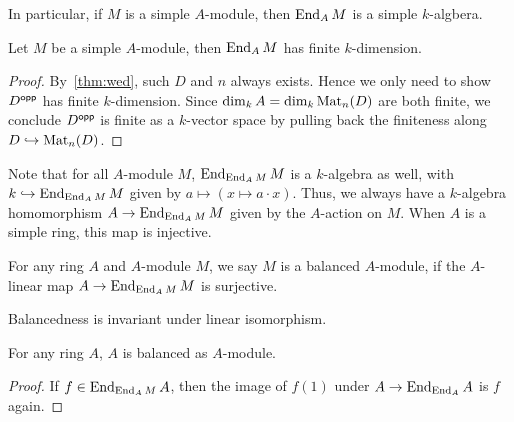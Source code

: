 \begin{remark}
  In particular, if $M$ is a simple $A$-module, then $\operatorname{End}_{A}M$ is a simple
  $k$-algbera.
\end{remark}

\begin{lemma}
  Let $M$ be a simple $A$-module, then $\operatorname{End}_{A}M$ has finite $k$-dimension.
  \leanok {}
\end{lemma}
\begin{proof}
  By~\cref{thm:wed}, such $D$ and $n$ always exists. Hence we only need to show
  $D^{\mathsf{opp}}$ has finite $k$-dimension. Since $\dim_{k}A=\dim_{k}\operatorname{Mat}_{n}(D)$ are
  both finite, we conclude $D^{\mathsf{opp}}$ is finite as a $k$-vector space by pulling
  back the finiteness along $D \hookrightarrow \operatorname{Mat}_{n}(D)$.
\end{proof}

\begin{remark}
  Note that for all $A$-module $M$, $\operatorname{End}_{\operatorname{End}_{A}M}M$ is a $k$-algebra as
  well, with $k \hookrightarrow \operatorname{End}_{\operatorname{End}_{A}M}M$ given by
  $a \mapsto (x \mapsto a\cdot x)$. Thus, we always have a $k$-algebra
  homomorphism $A \to \operatorname{End}_{\operatorname{End}_{A}M}M$ given by the $A$-action on $M$. When
  $A$ is a simple ring, this map is injective.
\end{remark}

\begin{definition}\label{def:balanced-mod}
  \leanok {} For any ring $A$ and $A$-module $M$, we say $M$ is a
  balanced $A$-module, if the $A$-linear map $A \to \operatorname{End}_{\operatorname{End}_{A}M}M$ is
  surjective.
\end{definition}

\begin{remark}
  Balancedness is invariant under linear isomorphism.
\end{remark}

\begin{lemma}\label{lem:balanced-self}
  For any ring $A$, $A$ is balanced as $A$-module. \leanok
\end{lemma}
\begin{proof}
  If $f \in \operatorname{End}_{\operatorname{End}_{A}M}A$, then the image of $f(1)$ under
  $A \to\operatorname{End}_{\operatorname{End}_{A}}A$ is $f$ again.
\end{proof}

